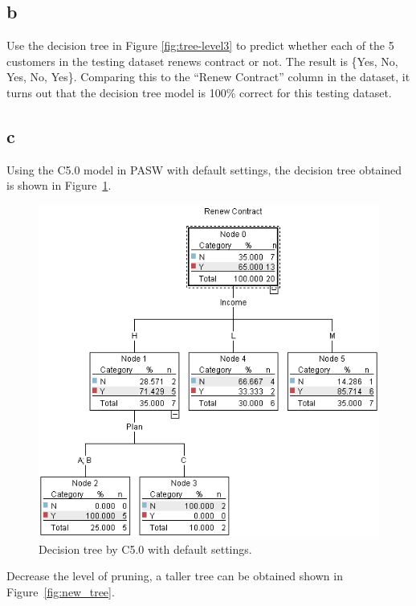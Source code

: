 \documentclass[12pt]{article}
\begin{document}
\subsection{b}
Use the decision tree in Figure \ref{fig:tree-level3} to predict whether each of the 5 customers in the testing dataset renews contract or not. The result is \{Yes, No, Yes, No, Yes\}. Comparing this to the ``Renew Contract'' column in the dataset, it turns out that the decision tree model is 100\% correct for this testing dataset.

\subsection{c}
Using the C5.0 model in PASW with default settings, the decision tree obtained is shown in Figure~\ref{fig:default_tree}.

\begin{figure}[!ht]
\begin{center}
\includegraphics[width=.9\textwidth]{fig/default_tree.png}
\caption{Decision tree by C5.0 with default settings.}
\label{fig:default_tree}
\end{center}
\end{figure}

Decrease the level of pruning, a taller tree can be obtained shown in Figure~\ref{fig:new_tree}.
\end{document}
